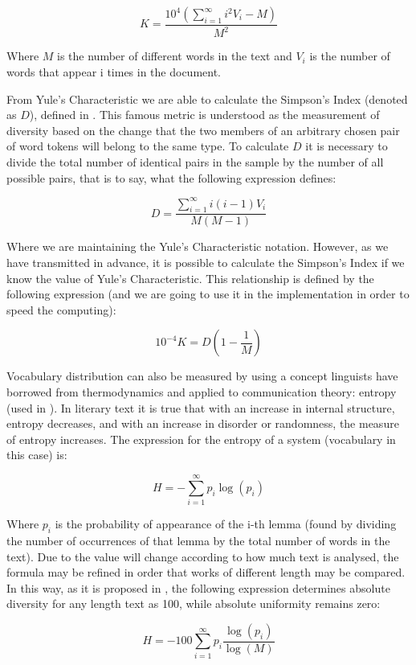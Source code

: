 $$
K = \frac{10^4\left(\sum_{i = 1}^\infty i^2V_i-M\right)}{M^2}
$$

Where $M$ is the number of different words in the text and $V_i$ is the number of words that appear i times in the document.

From Yule's Characteristic we are able to calculate the Simpson's Index (denoted as $D$), defined in \cite{simpson1949measurement}. This famous metric is understood as the measurement of diversity based on the change that the two members of an arbitrary chosen pair of word tokens will belong to the same type. To calculate $D$ it is necessary to divide the total number of identical pairs in the sample by the number of all possible pairs, that is to say, what the following expression defines:

$$
D = \frac{\sum_{i = 1}^\infty i(i-1)V_i}{M(M-1)}
$$

Where we are maintaining the Yule's Characteristic notation. However, as we have transmitted in advance, it is possible to calculate the Simpson's Index if we know the value of Yule's Characteristic. This relationship is defined by the following expression (and we are going to use it in the implementation in order to speed the computing):

$$
10^{-4}K=D\left(1-\frac{1}{M}\right)
$$

Vocabulary distribution can also be measured by using a concept linguists have borrowed from thermodynamics and applied to communication theory: entropy (used in \cite{holmes1985analysis}). In literary text it is true that with an increase in internal structure, entropy decreases, and with an increase in disorder or randomness, the measure of entropy increases. The expression for the entropy of a system (vocabulary in this case) is:

$$
H = -\sum_{i=1}^{\infty} p_i\log(p_i)
$$

Where $p_i$ is the probability of appearance of the i-th lemma (found by dividing the number of occurrences of that lemma by the total number of words in the text). Due to the value will change according to how much text is analysed, the formula may be refined in order that works of different length may be compared. In this way, as it is proposed in \cite{holmes1985analysis}, the following expression determines absolute diversity for any length text as 100, while absolute uniformity remains zero:

$$
H=-100\sum_{i = 1}^{\infty}p_i\frac{\log(p_i)}{\log(M)}
$$

